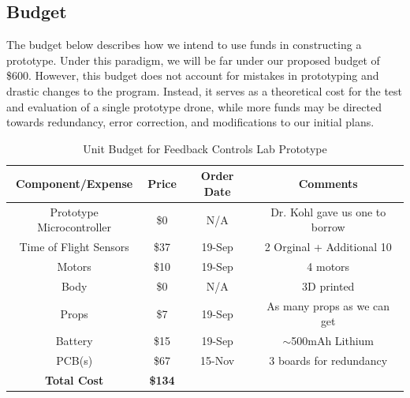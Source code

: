 \documentclass[12pt, titlepage]{article}
\begin{document}
\subsection{Budget}
The budget below describes how we intend to use funds in constructing a prototype. Under this paradigm, we will be far under our proposed budget of \$600. However, this budget does not account for mistakes in prototyping and drastic changes to the program. Instead, it serves as a theoretical cost for the test and evaluation of a single prototype drone, while more funds may be directed towards redundancy, error correction, and modifications to our initial plans.
\begin{table}[h!]
\centering
\caption{Unit Budget for Feedback Controls Lab Prototype}
\label{tab:budget}
\begin{tabular}{||c|c|c|c||}
\hline 
\hline
\textbf{Component/Expense} & \textbf{Price} & \textbf{Order Date} & \textbf{Comments} \\ 
\hline 
Prototype Microcontroller & \$0 & N/A & Dr. Kohl gave us one to borrow \\
\hline 
Time of Flight Sensors & \$37 & 19-Sep & 2 Orginal + Additional 10 \\
\hline 
Motors & \$10 & 19-Sep & 4 motors \\ 
\hline 
Body & \$0 & N/A & 3D printed \\ 
\hline 
Props & \$7 & 19-Sep & As many props as we can get \\ 
\hline 
Battery & \$15 & 19-Sep & $\sim$500mAh Lithium \\ 
\hline 
PCB(s) & \$67 & 15-Nov & 3 boards for redundancy \\ 
\hline 
\textbf{Total Cost} & \textbf{\$134} &  &  \\ 
\hline 
\hline
\end{tabular} 
\end{table}
\end{document}
